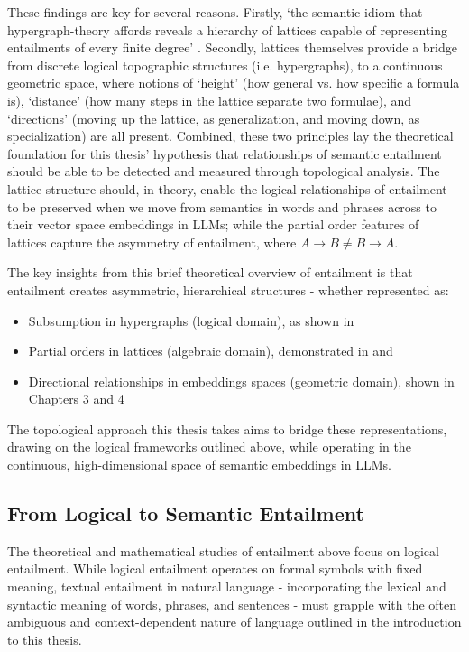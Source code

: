 \documentclass[12pt,twoside]{report}
\begin{document}
These findings are key for several reasons. Firstly, `the semantic idiom that hypergraph-theory affords reveals a hierarchy of lattices capable of representing entailments of every finite degree' \cite{leibnizianAnalysis}. Secondly, lattices themselves provide a bridge from discrete logical topographic structures (i.e. hypergraphs), to a continuous geometric space, where notions of `height' (how general vs. how specific a formula is), `distance' (how many steps in the lattice separate two formulae), and `directions' (moving up the lattice, as generalization, and moving down, as specialization) are all present. Combined, these two principles lay the theoretical foundation for this thesis' hypothesis that relationships of semantic entailment should be able to be detected and measured through topological analysis. The lattice structure should, in theory, enable the logical relationships of entailment to be preserved when we move from semantics in words and phrases across to their vector space embeddings in LLMs; while the partial order features of lattices capture the asymmetry of entailment, where $A \rightarrow B \neq B \rightarrow A$. \newline \par

The key insights from this brief theoretical overview of entailment is that entailment creates asymmetric, hierarchical structures - whether represented as:
\begin{itemize}
    \item Subsumption in hypergraphs (logical domain), as shown in \cite{leibnizianAnalysis}
    \item Partial orders in lattices (algebraic domain), demonstrated in \cite{Cederquist} and \cite{leibnizianAnalysis}
    \item Directional relationships in embeddings spaces (geometric domain), shown in Chapters 3 and 4
\end{itemize}


The topological approach this thesis takes aims to bridge these representations, drawing on the logical frameworks outlined above, while operating in the continuous, high-dimensional space of semantic embeddings in LLMs.


\subsection{From Logical to Semantic Entailment}

The theoretical and mathematical studies of entailment above focus on logical entailment. While logical entailment operates on formal symbols with fixed meaning, textual entailment in natural language - incorporating the lexical and syntactic meaning of words, phrases, and sentences - must grapple with the often ambiguous and context-dependent nature of language outlined in the introduction to this thesis. \newline \par
\end{document}
